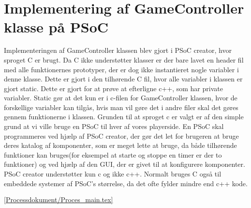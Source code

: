 \documentclass[Softwaredesign/Softwaredesign_main.tex]{subfiles}
\begin{document}
\section{Implementering af GameController klasse på PSoC}
Implementeringen af GameController klassen blev gjort i PSoC creator, hvor sproget C er brugt. Da C ikke understøtter klasser er der bare lavet en header fil med alle funktionernes prototyper, der er dog ikke instantieret nogle variabler i denne klasse. Dette er gjort i den tilhørende C fil, hvor alle variabler i klassen er gjort static. Dette er gjort for at prøve at efterligne c++, som har private variabler. Static gør at det kun er i c-filen for GameController klassen, hvor de forskellige variabler kan tilgås, hvis man vil gøre det i andre filer skal det gøres gennem funktionerne i klassen. Grunden til at sproget c er valgt er af den simple grund at vi ville bruge en PSoC til hver af vores playerside. En PSoC skal programmeres ved hjælp af PSoC creator, der gør det let for brugeren at bruge deres katalog af komponenter, som er meget lette at bruge, da både tilhørende funktioner kan bruges(for eksempel at starte og stoppe en timer er der to funktioner) og ved hjælp af den GUI, der er givet til at konfigurere komponenter. PSoC creator understøtter kun c og ikke c++. Normalt bruges C også til embeddede systemer af PSoC's størrelse, da det ofte fylder mindre end c++ kode.

\ref{Processdokument/Proces_main.tex}
\end{document}
